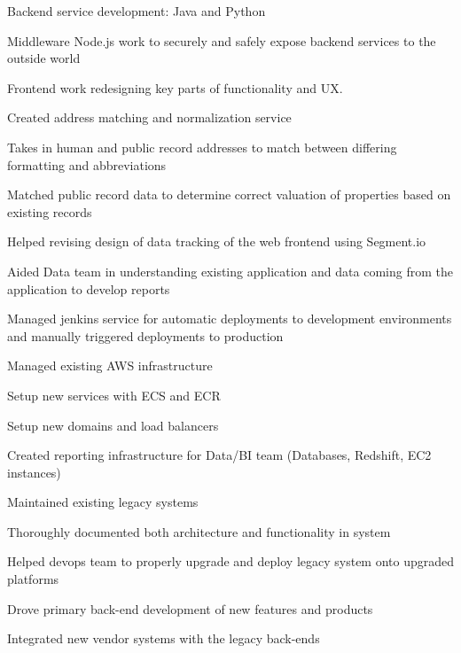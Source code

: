 \documentclass[table,tmargin=1in,bmargin=1in,letterpaper]{resume}
\begin{document}
\begin{compactitem}
\item Backend service development: Java and Python
\item Middleware Node.js work to securely and safely expose backend services to the outside world
\item Frontend work redesigning key parts of functionality and UX.
\item Created address matching and normalization service
  \begin{compactitem}
  \item Takes in human and public record addresses to match between differing formatting and abbreviations
  \item Matched public record data to determine correct valuation of properties based on existing records
  \end{compactitem}
\item Helped revising design of data tracking of the web frontend using Segment.io
\item Aided Data team in understanding existing application and data coming from the application to develop reports
\item Managed jenkins service for automatic deployments to development environments and manually triggered deployments to production
\item Managed existing AWS infrastructure
  \begin{compactitem}
  \item Setup new services with ECS and ECR
  \item Setup new domains and load balancers
  \item Created reporting infrastructure for Data/BI team (Databases, Redshift, EC2 instances)
  \end{compactitem}
\end{compactitem}

\begin{compactitem}
\item Maintained existing legacy systems
  \begin{compactitem}
  \item Thoroughly documented both architecture and functionality in system
  \item Helped devops team to properly upgrade and deploy legacy system onto upgraded platforms
  \end{compactitem}
\item Drove primary back-end development of new features and products
\item Integrated new vendor systems with the legacy back-ends
\end{compactitem}
\end{document}
